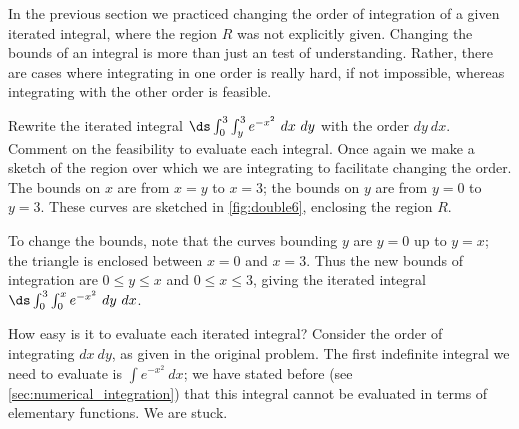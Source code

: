 In the previous section we practiced changing the order of integration of a given iterated integral, where the region $R$ was not explicitly given. Changing the bounds of an integral is more than just an test of understanding. Rather, there are cases where integrating in one order is really hard, if not impossible, whereas integrating with the other order is feasible.

\begin{example}\label{ex_double6}
Rewrite the iterated integral $\ds \int_0^3\int_y^3 e^{-x^2}\ dx\ dy$ with the order $dy\ dx$. Comment on the feasibility to evaluate each integral.
\solution
Once again we make a sketch of the region over which we are integrating to facilitate changing the order. The bounds on $x$ are from $x=y$ to $x=3$; the bounds on $y$ are from $y=0$ to $y=3$. These curves are sketched in \autoref{fig:double6}, enclosing the region $R$.


To change the bounds, note that the curves bounding $y$ are $y=0$ up to $y=x$; the triangle is enclosed between $x=0$ and $x=3$. Thus the new bounds of integration are $0\leq y\leq x$ and $0\leq x\leq 3$, giving the iterated integral $\ds \int_0^3\int_0^x e^{-x^2}\ dy\ dx$.

How easy is it to evaluate each iterated integral? Consider the order of integrating $dx\ dy$, as given in the original problem. The first indefinite integral we need to evaluate is $\int e^{-x^2}\ dx$; we have stated before (see \autoref{sec:numerical_integration}) that this integral cannot be evaluated in terms of elementary functions. We are stuck.


\end{example}
